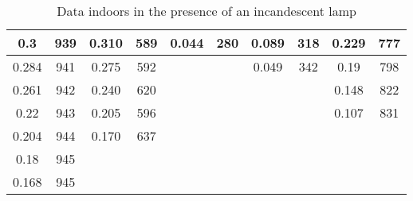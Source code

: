 \begin{table}[H]
\begin{tabular}{|cc|cc|cc|cc|cc|}
		\multicolumn{1}{|c|}{0.3}            & 939                                & \multicolumn{1}{c|}{0.310}          & 589                               & \multicolumn{1}{c|}{0.044}           & 280                   & \multicolumn{1}{c|}{0.089}      & 318                   & \multicolumn{1}{c|}{0.229}      & 777                   \\ \hline
		\multicolumn{1}{|c|}{0.284}          & 941                                & \multicolumn{1}{c|}{0.275}          & 592                               & \multicolumn{1}{c|}{}                &                       & \multicolumn{1}{c|}{0.049}      & 342                   & \multicolumn{1}{c|}{0.19}       & 798                   \\ \hline
		\multicolumn{1}{|c|}{0.261}          & 942                                & \multicolumn{1}{c|}{0.240}          & 620                               & \multicolumn{1}{c|}{}                &                       & \multicolumn{1}{c|}{}           &                       & \multicolumn{1}{c|}{0.148}      & 822                   \\ \hline
		\multicolumn{1}{|c|}{0.22}           & 943                                & \multicolumn{1}{c|}{0.205}          & 596                               & \multicolumn{1}{c|}{}                &                       & \multicolumn{1}{c|}{}           &                       & \multicolumn{1}{c|}{0.107}      & 831                   \\ \hline
		\multicolumn{1}{|c|}{0.204}          & 944                                & \multicolumn{1}{c|}{0.170}          & 637                               & \multicolumn{1}{c|}{}                &                       & \multicolumn{1}{c|}{}           &                       & \multicolumn{1}{c|}{}           &                       \\ \hline
		\multicolumn{1}{|c|}{0.18}           & 945                                & \multicolumn{1}{c|}{}               &                                   & \multicolumn{1}{c|}{}                &                       & \multicolumn{1}{c|}{}           &                       & \multicolumn{1}{c|}{}           &                       \\ \hline
		\multicolumn{1}{|c|}{0.168}          & 945                                & \multicolumn{1}{c|}{}               &                                   & \multicolumn{1}{c|}{}                &                       & \multicolumn{1}{c|}{}           &                       & \multicolumn{1}{c|}{}           &                       \\ \hline
	\end{tabular}
	\caption{Data indoors in the presence of an incandescent lamp}
	\label{tab:indoor}
\end{table}